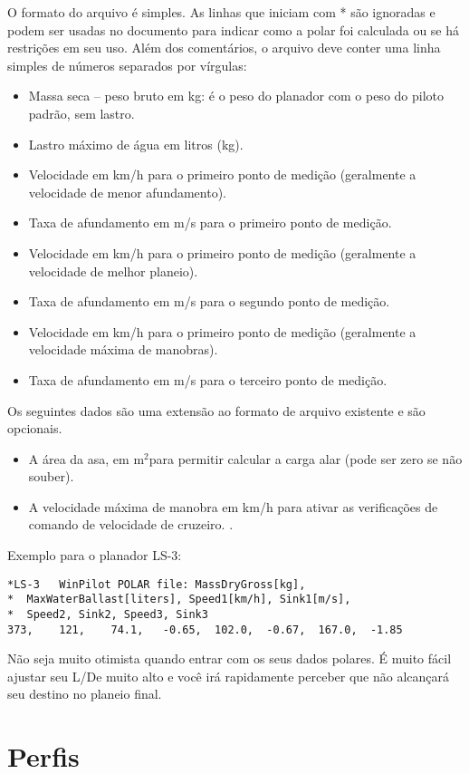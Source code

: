 O formato do arquivo é simples.  As linhas que iniciam com * são ignoradas e podem ser usadas no documento para indicar como a polar foi calculada ou se há restrições em seu uso.  Além dos comentários, o arquivo deve conter uma linha simples de números separados por vírgulas:

\begin{itemize}
\item Massa seca – peso bruto em kg:  é o peso do planador com o peso do piloto padrão, sem lastro.
\item Lastro máximo de água em litros (kg).
\item Velocidade em km/h para o primeiro ponto de medição (geralmente a velocidade de menor afundamento).
\item Taxa de afundamento em m/s para o primeiro ponto de medição.
\item Velocidade em km/h para o primeiro ponto de medição (geralmente a velocidade de melhor planeio).
\item Taxa de afundamento em m/s para o segundo ponto de medição.
\item Velocidade em km/h para o primeiro ponto de medição (geralmente a velocidade máxima de manobras).
\item Taxa de afundamento em m/s para o terceiro ponto de medição.
\end{itemize}
Os seguintes dados são uma extensão ao formato de arquivo existente e são opcionais.
\begin{itemize}
\item A área da asa, em m$^2$para permitir calcular a carga alar (pode ser zero se não souber).
\item A velocidade máxima de manobra em km/h para ativar as verificações de comando de velocidade de cruzeiro. . 
\end{itemize}

Exemplo para o planador LS-3:
\begin{verbatim}
*LS-3	WinPilot POLAR file: MassDryGross[kg], 
*  MaxWaterBallast[liters], Speed1[km/h], Sink1[m/s], 
*  Speed2, Sink2, Speed3, Sink3  	
373,	121,	74.1,	-0.65,	102.0,	-0.67,	167.0,	-1.85
\end{verbatim}

\tip Não seja muito otimista quando entrar com os seus dados polares.  É muito fácil ajustar seu L/De muito alto e você irá rapidamente perceber que não alcançará seu destino no planeio final.

\section{Perfis}

